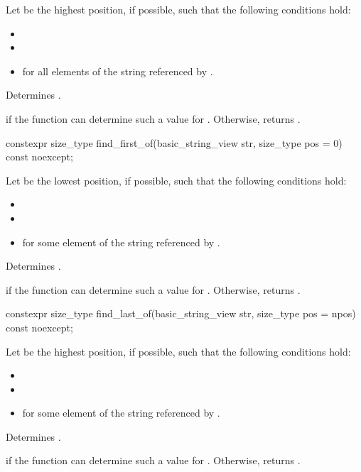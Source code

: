 \begin{itemdescr}
\pnum
Let  be the highest position, if possible, such that the following conditions hold:
\begin{itemize}
\item
{}
\item
{}
\item
{} for all elements  of the string referenced by .
\end{itemize}

\pnum
\effects
Determines .

\pnum
\returns
{} if the function can determine such a value for .
Otherwise, returns .
\end{itemdescr}

%
\begin{itemdecl}
constexpr size_type find_first_of(basic_string_view str, size_type pos = 0) const noexcept;
\end{itemdecl}

\begin{itemdescr}
\pnum
Let  be the lowest position, if possible, such that the following conditions hold:
\begin{itemize}
\item
{}
\item
{}
\item
{} for some element  of the string referenced by .
\end{itemize}

\pnum
\effects
Determines .

\pnum
\returns
{} if the function can determine such a value for .
Otherwise, returns .
\end{itemdescr}

%
\begin{itemdecl}
constexpr size_type find_last_of(basic_string_view str, size_type pos = npos) const noexcept;
\end{itemdecl}

\begin{itemdescr}
\pnum
Let  be the highest position, if possible, such that the following conditions hold:
\begin{itemize}
\item
{}
\item
{}
\item
{} for some element  of the string referenced by .
\end{itemize}

\pnum
\effects
Determines .

\pnum
\returns
{} if the function can determine such a value for .
Otherwise, returns .
\end{itemdescr}

